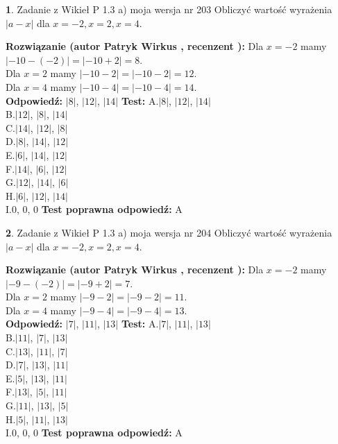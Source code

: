 \documentclass[12pt, a4paper]{article}
\theoremstyle{definition} %
\newtheorem{zad}{}
\newcommand{\zadStart}[1]{\begin{zad}#1\newline}
\newcommand{\zadStop}{\end{zad}}
\newcommand{\rozwStart}[2]{\noindent \textbf{Rozwiązanie (autor #1 , recenzent #2): }\newline}
\newcommand{\rozwStop}{\newline}
\newcommand{\odpStart}{\noindent \textbf{Odpowiedź:}\newline}
\newcommand{\odpStop}{\newline}
\newcommand{\testStart}{\noindent \textbf{Test:}\newline}
\newcommand{\testStop}{\newline}
\newcommand{\kluczStart}{\noindent \textbf{Test poprawna odpowiedź:}\newline}
\newcommand{\kluczStop}{\newline}
\begin{document}
\zadStart{Zadanie z Wikieł P 1.3 a) moja wersja nr 203}
Obliczyć wartość wyrażenia $|a - x|$ dla $x=-2,x=2,x=4$.
\zadStop
\rozwStart{Patryk Wirkus}{}
Dla $x = -2$ mamy $|-10 - (-2)| = |-10 + 2| = 8$.\\
Dla $x = 2$ mamy $|-10 - 2| = |-10 - 2| = 12$.\\
Dla $x = 4$ mamy $|-10 - 4| = |-10 - 4| = 14$.\\
\rozwStop
\odpStart
$|8|$, $|12|$, $|14|$
\odpStop
\testStart
A.$|8|$, $|12|$, $|14|$\\
B.$|12|$, $|8|$, $|14|$\\
C.$|14|$, $|12|$, $|8|$\\
D.$|8|$, $|14|$, $|12|$\\
E.$|6|$, $|14|$, $|12|$\\
F.$|14|$, $|6|$, $|12|$\\
G.$|12|$, $|14|$, $|6|$\\
H.$|6|$, $|12|$, $|14|$\\
I.$0$, $0$, $0$
\testStop
\kluczStart
A
\kluczStop



\zadStart{Zadanie z Wikieł P 1.3 a) moja wersja nr 204}
Obliczyć wartość wyrażenia $|a - x|$ dla $x=-2,x=2,x=4$.
\zadStop
\rozwStart{Patryk Wirkus}{}
Dla $x = -2$ mamy $|-9 - (-2)| = |-9 + 2| = 7$.\\
Dla $x = 2$ mamy $|-9 - 2| = |-9 - 2| = 11$.\\
Dla $x = 4$ mamy $|-9 - 4| = |-9 - 4| = 13$.\\
\rozwStop
\odpStart
$|7|$, $|11|$, $|13|$
\odpStop
\testStart
A.$|7|$, $|11|$, $|13|$\\
B.$|11|$, $|7|$, $|13|$\\
C.$|13|$, $|11|$, $|7|$\\
D.$|7|$, $|13|$, $|11|$\\
E.$|5|$, $|13|$, $|11|$\\
F.$|13|$, $|5|$, $|11|$\\
G.$|11|$, $|13|$, $|5|$\\
H.$|5|$, $|11|$, $|13|$\\
I.$0$, $0$, $0$
\testStop
\kluczStart
A
\kluczStop
\end{document}
